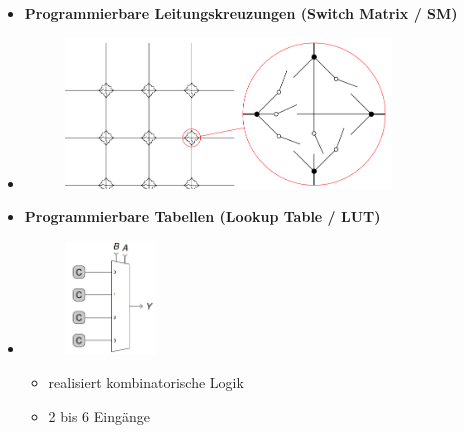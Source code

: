 \documentclass[11pt,a4paper]{article}
\begin{document}
\begin{itemize}
\pagebreak

\item \textbf{Programmierbare Leitungskreuzungen (Switch Matrix / SM)}
\item[]
			\begin{figure}[H]
			\begin{center}
			\includegraphics[height=4cm]{switchmatrix}
			\end{center}
			\end{figure}
			
\item \textbf{Programmierbare Tabellen (Lookup Table / LUT)}
\item[]
		\begin{minipage}{0.3\textwidth}
				\begin{figure}[H]
				\includegraphics[height=3cm]{lookuptable}
				\end{figure}
			\end{minipage}
			\begin{minipage}[t]{0.5\textwidth}
				\vspace{-1.25cm}
				\begin{itemize}
				\item realisiert kombinatorische Logik
				\item 2 bis 6 Eingänge
				\end{itemize}
			\end{minipage}
			

\end{itemize}
\end{document}
